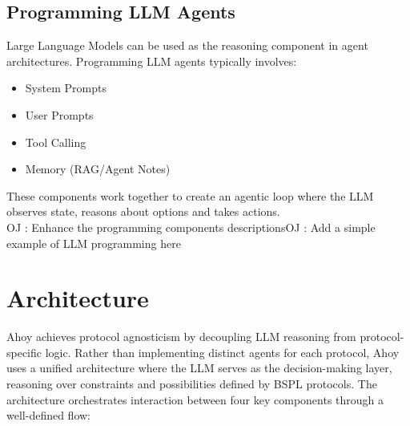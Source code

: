 \documentclass[runningheads]{llncs}
\newcounter{ojcount}
\newcommand{\oj}[1]{\stepcounter{ojcount}\textcolor{green!60!black}{\textsf{OJ \theojcount: #1}\newline}}
\newcommand{\ahoy}{Ahoy\xspace}
\begin{document}
\subsection{Programming LLM Agents}
Large Language Models can be used as the reasoning component in agent architectures.
Programming LLM agents typically involves:
\begin{itemize}
    \item System Prompts
    \item User Prompts
    \item Tool Calling
    \item Memory (RAG/Agent Notes)
\end{itemize}
These components work together to create an agentic loop where the LLM observes state, reasons about options and takes actions.\\
\oj{Enhance the programming components descriptions}\oj{Add a simple example of LLM programming here}

\section{Architecture}

\ahoy achieves protocol agnosticism by decoupling LLM reasoning from protocol-specific logic. 
Rather than implementing distinct agents for each protocol, \ahoy uses a unified architecture where the LLM serves as the decision-making layer, reasoning over constraints and possibilities defined by BSPL protocols.
The architecture orchestrates interaction between four key components through a well-defined flow:
\end{document}
